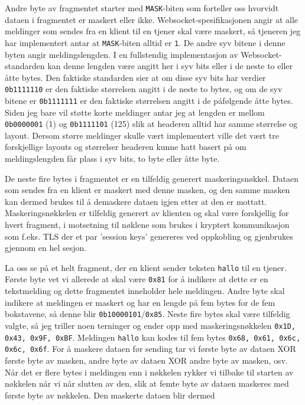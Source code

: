 \documentclass{article}
\newcommand{\code}[1]{\colorbox{light-gray}{\texttt{#1}}}
\begin{document}
Andre byte av fragmentet starter med \code{MASK}-biten som forteller oss hvorvidt dataen i fragmentet er maskert eller ikke. Websocket-spesifikasjonen angir at alle meldinger som sendes fra en klient til en tjener skal være maskert, så tjeneren jeg har implementert antar at \code{MASK}-biten alltid er \texttt{1}. De andre syv bitene i denne byten angir meldingslengden. I en fullstendig implementasjon av Websocket-standarden kan denne lengden være angitt her i syv bits eller i de neste to eller åtte bytes. Den faktiske standarden sier at om disse syv bits har verdier \code{0b1111110} er den faktiske størrelsen angitt i de neste to bytes, og om de syv bitene er \code{0b1111111} er den faktiske størrelsen angitt i de påfølgende åtte bytes. Siden jeg bare vil støtte korte meldinger antar jeg at lengden er mellom \code{0b0000001} (1) og \code{0b1111101} (125) slik at headeren alltid har samme størrelse og layout. Dersom større meldinger skulle vært implementert ville det vært tre forskjellige layouts og størrelser headeren kunne hatt basert på om meldingslengden får plass i syv bits, to byte eller åtte byte.

De neste fire bytes i fragmentet er en tilfeldig generert maskeringsnøkkel. Dataen som sendes fra en klient er maskert med denne masken, og den samme masken kan dermed brukes til å demaskere dataen igjen etter at den er mottatt. Maskeringsnøkkelen er tilfeldig generert av klienten og skal være forskjellig for hvert fragment, i motsetning til nøklene som brukes i kryptert kommunikasjon som f.eks. TLS der et par 'session keys' genereres ved oppkobling og gjenbrukes gjennom en hel sesjon.

La oss se på et helt fragment, der en klient sender teksten \code{hallo} til en tjener. Første byte vet vi allerede at skal være \code{0x81} for å indikere at dette er en tekstmelding og dette fragmentet inneholder hele meldingen. Andre byte skal indikere at meldingen er maskert og har en lengde på fem bytes for de fem bokstavene, så denne blir \code{0b10000101}/\code{0x85}. Neste fire bytes skal være tilfeldig valgte, så jeg triller noen terninger og ender opp med maskeringsnøkkelen \code{0x1D, 0x43, 0x9F, 0xBF}. Meldingen \code{hallo} kan kodes til fem bytes \code{0x68, 0x61, 0x6c, 0x6c, 0x6f}. For å maskere dataen før sending tar vi første byte av dataen XOR første byte av masken, andre byte av dataen XOR andre byte av masken, osv. Når det er flere bytes i meldingen enn i nøkkelen rykker vi tilbake til starten av nøkkelen når vi når slutten av den, slik at femte byte av dataen maskeres med første byte av nøkkelen. Den maskerte dataen blir dermed 
\end{document}
